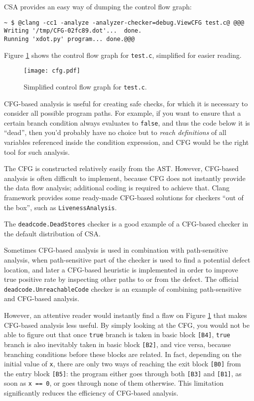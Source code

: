 \documentclass[a4paper,12pt]{article}
\def\imgscale{0.20}
\newenvironment{nobr}{\begin{minipage}{\textwidth}\setlength\parskip{1em}
}{\end{minipage}\ignorespacesafterend}
\begin{document}
\begin{nobr}
CSA provides an easy way of dumping the control flow graph:

\begin{lstlisting}[style=commandline]
~ $ @clang -cc1 -analyze -analyzer-checker=debug.ViewCFG test.c@ @@@
Writing '/tmp/CFG-02fc89.dot'...  done.
Running 'xdot.py' program... done.@@@
\end{lstlisting}
\end{nobr}

Figure \ref{fig:cfg} shows the control flow graph for \lstinline|test.c|, simplified for easier reading.

\begin{figure}[!ht]\center
\texttt{[image: cfg.pdf]}
\caption{Simplified control flow graph for \lstinline|test.c|.}
\label{fig:cfg}
\end{figure}

CFG-based analysis is useful for creating safe checks, for which it is necessary to consider all possible program paths. For example, if you want to ensure that a certain branch condition always evaluates to \lstinline|false|, and thus the code below it is ``dead'', then you'd probably have no choice but to \emph{reach definitions} of all variables referenced inside the condition expression, and CFG would be the right tool for such analysis.

The CFG is constructed relatively easily from the AST. However, CFG-based analysis is often difficult to implement, because CFG does not instantly provide the data flow analysis; additional coding is required to achieve that. Clang framework provides some ready-made CFG-based solutions for checkers ``out of the box'', such as \lstinline|LivenessAnalysis|.

The \lstinline|deadcode.DeadStores| checker is a good example of a CFG-based checker in the default distribution of CSA.

Sometimes CFG-based analysis is used in combination with path-sensitive analysis, when path-sensitive part of the checker is used to find a potential defect location, and later a CFG-based heuristic is implemented in order to improve true positive rate by inspecting other paths to or from the defect. The official \lstinline|deadcode.UnreachableCode| checker is an example of combining path-sensitive and CFG-based analysis.

However, an attentive reader would instantly find a flaw on Figure \ref{fig:cfg} that makes CFG-based analysis less useful. By simply looking at the CFG, you would not be able to figure out that once \lstinline|true| branch is taken in basic block \lstinline|[B4]|, \lstinline|true| branch is also inevitably taken in basic block \lstinline|[B2]|, and vice versa, because branching conditions before these blocks are related. In fact, depending on the initial value of \lstinline|x|, there are only two ways of reaching the exit block \lstinline|[B0]| from the entry block \lstinline|[B5]|: the program either goes through both \lstinline|[B3]| and \lstinline|[B1]|, as soon as \lstinline|x == 0|, or goes through none of them otherwise. This limitation significantly reduces the efficiency of CFG-based analysis.
\end{document}
